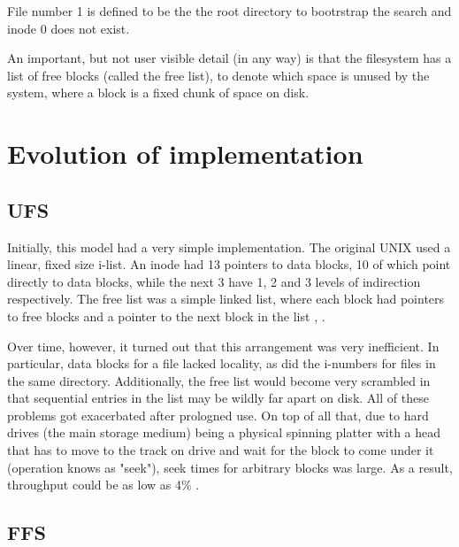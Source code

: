         File number 1 is defined to be the the root directory to bootrstrap the
        search and inode 0 does not exist.

        An important, but not user visible detail (in any way) is that the
        filesystem has a list of free blocks (called the free list), to denote
        which space is unused by the system, where a block is a fixed chunk of
        space on disk.


    \section{Evolution of implementation}

        \subsection{UFS}

            Initially, this model had a very simple implementation. The
            original UNIX used a linear, fixed size i-list. An inode had 13
            pointers to data blocks, 10 of which point directly to data blocks,
            while the next 3 have 1, 2 and 3 levels of indirection
            respectively. The free list was a simple linked list, where
            each block had pointers to free blocks and a pointer to the
            next block in the list \cite{UNIX_implementation},
            \cite{UNIX_thompson}.

            Over time, however, it turned out that this arrangement was very
            inefficient. In particular, data blocks for a file lacked locality,
            as did the i-numbers for files in the same directory. Additionally,
            the free list would become very scrambled in that sequential
            entries in the list may be wildly far apart on disk. All of these
            problems got exacerbated after prologned use. On top of all that,
            due to hard drives (the main storage medium) being a physical
            spinning platter with a head that has to move to the track on drive
            and wait for the block to come under it (operation knows as
            "seek"), seek times for arbitrary blocks was large. As a result,
            throughput could be as low as 4\% \cite{FFS}.


        \subsection{FFS}


